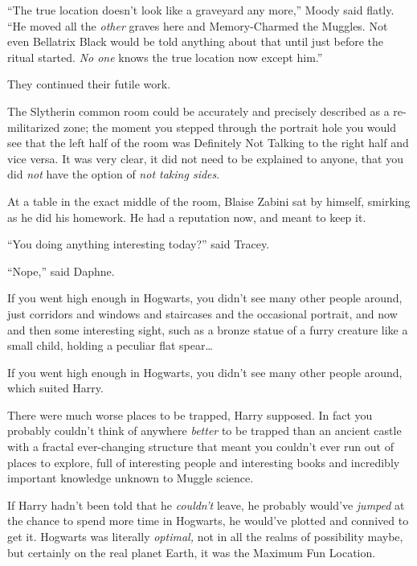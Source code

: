 “The true location doesn’t look like a graveyard any more,” Moody said flatly. “He moved all the \emph{other} graves here and Memory-Charmed the Muggles. Not even Bellatrix Black would be told anything about that until just before the ritual started. \emph{No one} knows the true location now except him.”

They continued their futile work.


The Slytherin common room could be accurately and precisely described as a re-militarized zone; the moment you stepped through the portrait hole you would see that the left half of the room was Definitely Not Talking to the right half and vice versa. It was very clear, it did not need to be explained to anyone, that you did \emph{not} have the option of \emph{not taking sides}.

At a table in the exact middle of the room, Blaise Zabini sat by himself, smirking as he did his homework. He had a reputation now, and meant to keep it.


“You doing anything interesting today?” said Tracey.

“Nope,” said Daphne.


If you went high enough in Hogwarts, you didn’t see many other people around, just corridors and windows and staircases and the occasional portrait, and now and then some interesting sight, such as a bronze statue of a furry creature like a small child, holding a peculiar flat spear…

If you went high enough in Hogwarts, you didn’t see many other people around, which suited Harry.

There were much worse places to be trapped, Harry supposed. In fact you probably couldn’t think of anywhere \emph{better} to be trapped than an ancient castle with a fractal ever-changing structure that meant you couldn’t ever run out of places to explore, full of interesting people and interesting books and incredibly important knowledge unknown to Muggle science.

If Harry hadn’t been told that he \emph{couldn’t} leave, he probably would’ve \emph{jumped} at the chance to spend more time in Hogwarts, he would’ve plotted and connived to get it. Hogwarts was literally \emph{optimal,} not in all the realms of possibility maybe, but certainly on the real planet Earth, it was the Maximum Fun Location.


